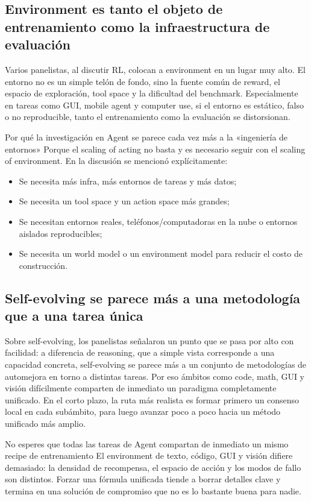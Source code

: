\documentclass[a4paper]{article}
\begin{document}
\subsection{Environment es tanto el objeto de entrenamiento como la infraestructura de evaluación}
Varios panelistas, al discutir RL, colocan a environment en un lugar muy alto. El entorno no es un simple telón de fondo, sino la fuente común de reward, el espacio de exploración, tool space y la dificultad del benchmark. Especialmente en tareas como GUI, mobile agent y computer use, si el entorno es estático, falso o no reproducible, tanto el entrenamiento como la evaluación se distorsionan.

\begin{knowledgebox}{Por qué la investigación en Agent se parece cada vez más a la «ingeniería de entornos»}
Porque el scaling of acting no basta y es necesario seguir con el scaling of environment. En la discusión se mencionó explícitamente:
\begin{itemize}
  \item Se necesita más infra, más entornos de tareas y más datos;
  \item Se necesita un tool space y un action space más grandes;
  \item Se necesitan entornos reales, teléfonos/computadoras en la nube o entornos aislados reproducibles;
  \item Se necesita un world model o un environment model para reducir el costo de construcción.
\end{itemize}
\end{knowledgebox}

\subsection{Self-evolving se parece más a una metodología que a una tarea única}
Sobre self-evolving, los panelistas señalaron un punto que se pasa por alto con facilidad: a diferencia de reasoning, que a simple vista corresponde a una capacidad concreta, self-evolving se parece más a un conjunto de metodologías de automejora en torno a distintas tareas. Por eso ámbitos como code, math, GUI y visión difícilmente comparten de inmediato un paradigma completamente unificado. En el corto plazo, la ruta más realista es formar primero un consenso local en cada subámbito, para luego avanzar poco a poco hacia un método unificado más amplio.

\begin{warningbox}{No esperes que todas las tareas de Agent compartan de inmediato un mismo recipe de entrenamiento}
El environment de texto, código, GUI y visión difiere demasiado: la densidad de recompensa, el espacio de acción y los modos de fallo son distintos. Forzar una fórmula unificada tiende a borrar detalles clave y termina en una solución de compromiso que no es lo bastante buena para nadie.
\end{warningbox}
\end{document}
